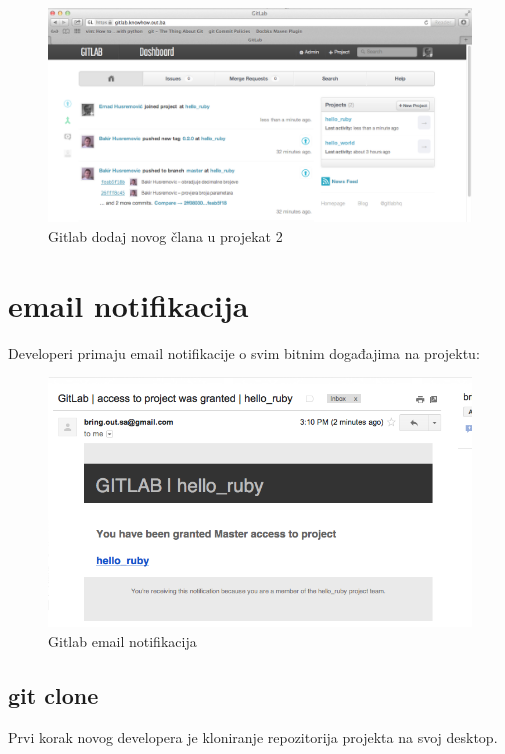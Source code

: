 \documentclass[times, utf8, seminar]{fit}
\begin{document}
\begin{figure}[H]
\centering
\includegraphics[width=15cm]{img/gitlab_add_new_member_to_project_2.png}
\caption{Gitlab dodaj novog člana u projekat 2}
\end{figure}

\section{email notifikacija}

Developeri primaju email notifikacije o svim bitnim događajima na projektu:

\begin{figure}[H]
\centering
\includegraphics[width=15cm]{img/gitlab_email_notification.png}
\caption{Gitlab email notifikacija}
\end{figure}


\subsection{git clone}

Prvi korak novog developera je kloniranje repozitorija projekta na svoj desktop. 
\end{document}
